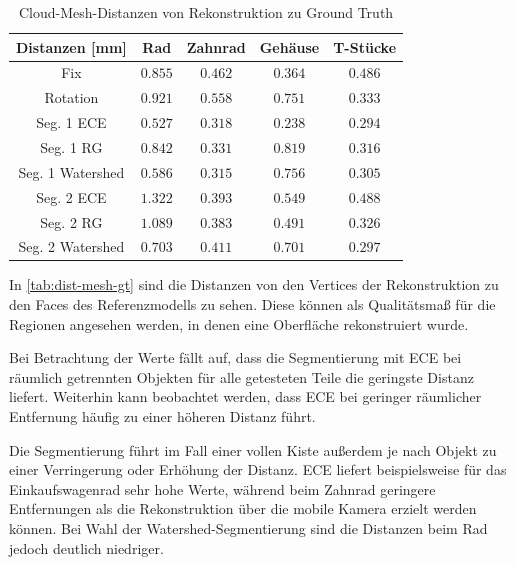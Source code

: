 \begin{table}[H]
	\centering
	\begin{tabular}{| c || c | c | c | c |}
		\hline
		\textbf{Distanzen [mm]} & Rad & Zahnrad & Gehäuse & T-Stücke\\
		\hline\hline
		Fix & $0.855$ & $0.462$ & $0.364$ & $0.486$\\
		\hline
		Rotation & $0.921$ & $0.558$ & $0.751$ & $0.333$\\
		\hline
		Seg. 1 \ac{ECE} & $0.527$ & $0.318$ & $0.238$ & $0.294$\\
		\hline
		Seg. 1 \ac{RG} & $0.842$ & $0.331$ & $0.819$ & $0.316$\\
		\hline
		Seg. 1 Watershed & $0.586$ & $0.315$ & $0.756$ & $0.305$\\
		\hline
		Seg. 2 \ac{ECE} & $1.322$ & $0.393$ & $0.549$ & $0.488$\\
		\hline
		Seg. 2 \ac{RG} & $1.089$ & $0.383$ & $0.491$ & $0.326$\\
		\hline
		Seg. 2 Watershed & $0.703$ & $0.411$ & $0.701$ & $0.297$\\
		\hline
	\end{tabular}
	\caption{Cloud-Mesh-Distanzen von Rekonstruktion zu Ground Truth}
	\label{tab:dist-mesh-gt}
\end{table}

In \autoref{tab:dist-mesh-gt} sind die Distanzen von den Vertices der Rekonstruktion zu den Faces des Referenzmodells zu sehen.
Diese können als Qualitätsmaß für die Regionen angesehen werden, in denen eine Oberfläche rekonstruiert wurde.

Bei Betrachtung der Werte fällt auf, dass die Segmentierung mit \ac{ECE} bei räumlich getrennten Objekten für alle getesteten Teile die geringste Distanz liefert.
Weiterhin kann beobachtet werden, dass \ac{ECE} bei geringer räumlicher Entfernung häufig zu einer höheren Distanz führt.

Die Segmentierung führt im Fall einer vollen Kiste außerdem je nach Objekt zu einer Verringerung oder Erhöhung der Distanz.
\ac{ECE} liefert beispielsweise für das Einkaufswagenrad sehr hohe Werte, während beim Zahnrad geringere Entfernungen als die Rekonstruktion über die mobile Kamera erzielt werden können.
Bei Wahl der Watershed-Segmentierung sind die Distanzen beim Rad jedoch deutlich niedriger.

